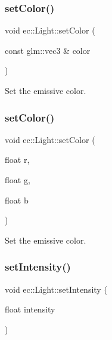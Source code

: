 \subsubsection{\texorpdfstring{set\+Color()}{setColor()}\hspace{0.1cm}{\footnotesize\ttfamily [1/2]}}
{\footnotesize\ttfamily void ec\+::\+Light\+::set\+Color (\begin{DoxyParamCaption}\item[{const glm\+::vec3 \&}]{color }\end{DoxyParamCaption})}



Set the emissive color. 

\mbox{\label{classec_1_1_light_aaa6d6edfe31b15dc259a8fa0d59ef8de}} 
\subsubsection{\texorpdfstring{set\+Color()}{setColor()}\hspace{0.1cm}{\footnotesize\ttfamily [2/2]}}
{\footnotesize\ttfamily void ec\+::\+Light\+::set\+Color (\begin{DoxyParamCaption}\item[{float}]{r,  }\item[{float}]{g,  }\item[{float}]{b }\end{DoxyParamCaption})}



Set the emissive color. 

\mbox{\label{classec_1_1_light_ae2b2bbbc88aef9d531627bb90f7b0183}} 
\subsubsection{\texorpdfstring{set\+Intensity()}{setIntensity()}}
{\footnotesize\ttfamily void ec\+::\+Light\+::set\+Intensity (\begin{DoxyParamCaption}\item[{float}]{intensity }\end{DoxyParamCaption})}



